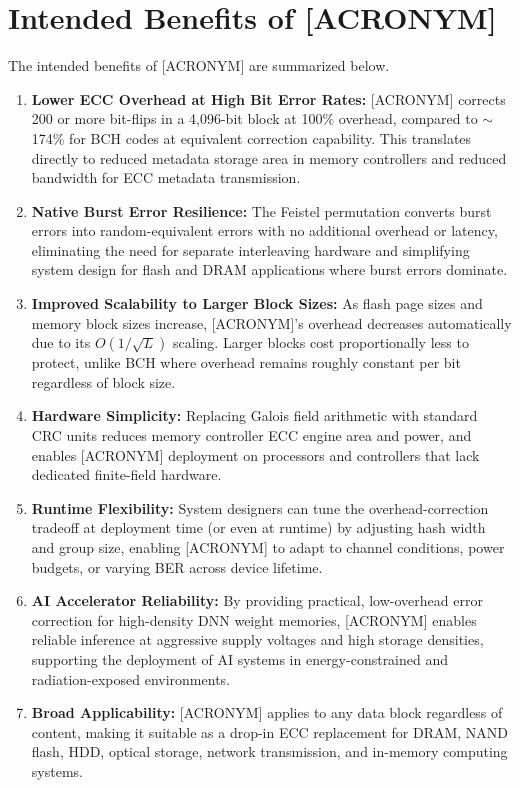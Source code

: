 \section*{Intended Benefits of [ACRONYM]}

\noindent The intended benefits of [ACRONYM] are summarized below.

\begin{enumerate}

    \item \textbf{Lower ECC Overhead at High Bit Error Rates:} [ACRONYM] corrects 200 or more bit-flips in a 4,096-bit block at 100\% overhead, compared to $\sim$174\% for BCH codes at equivalent correction capability. This translates directly to reduced metadata storage area in memory controllers and reduced bandwidth for ECC metadata transmission.

    \item \textbf{Native Burst Error Resilience:} The Feistel permutation converts burst errors into random-equivalent errors with no additional overhead or latency, eliminating the need for separate interleaving hardware and simplifying system design for flash and DRAM applications where burst errors dominate.

    \item \textbf{Improved Scalability to Larger Block Sizes:} As flash page sizes and memory block sizes increase, [ACRONYM]'s overhead decreases automatically due to its $O(1/\sqrt{L})$ scaling. Larger blocks cost proportionally less to protect, unlike BCH where overhead remains roughly constant per bit regardless of block size.

    \item \textbf{Hardware Simplicity:} Replacing Galois field arithmetic with standard CRC units reduces memory controller ECC engine area and power, and enables [ACRONYM] deployment on processors and controllers that lack dedicated finite-field hardware.

    \item \textbf{Runtime Flexibility:} System designers can tune the overhead-correction tradeoff at deployment time (or even at runtime) by adjusting hash width and group size, enabling [ACRONYM] to adapt to channel conditions, power budgets, or varying BER across device lifetime.

    \item \textbf{AI Accelerator Reliability:} By providing practical, low-overhead error correction for high-density DNN weight memories, [ACRONYM] enables reliable inference at aggressive supply voltages and high storage densities, supporting the deployment of AI systems in energy-constrained and radiation-exposed environments.

    \item \textbf{Broad Applicability:} [ACRONYM] applies to any data block regardless of content, making it suitable as a drop-in ECC replacement for DRAM, NAND flash, HDD, optical storage, network transmission, and in-memory computing systems.

\end{enumerate}
